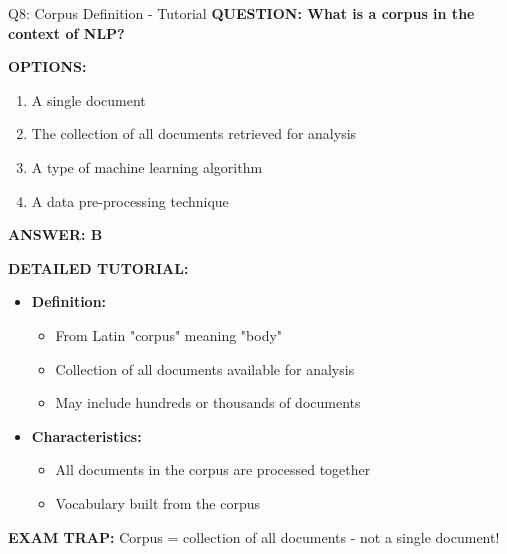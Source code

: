\documentclass[8pt]{beamer}
\begin{document}
	\begin{frame}{Q8: Corpus Definition - Tutorial}
		\fontsize{6.5}{7.5}\selectfont
		\textbf{QUESTION: What is a corpus in the context of NLP?}
		
		\vspace{0.1cm}
		\textbf{OPTIONS:}
		\begin{enumerate}
			\item A single document
			\item The collection of all documents retrieved for analysis
			\item A type of machine learning algorithm
			\item A data pre-processing technique
		\end{enumerate}
		
		\vspace{0.1cm}
		\textcolor{myblue}{\textbf{ANSWER: B}}
		
		\vspace{0.1cm}
		\textbf{DETAILED TUTORIAL:}
		\begin{itemize}
			\item \textbf{Definition:}
			\begin{itemize}
				\item From Latin "corpus" meaning "body"
				\item Collection of all documents available for analysis
				\item May include hundreds or thousands of documents
			\end{itemize}
			\item \textbf{Characteristics:}
			\begin{itemize}
				\item All documents in the corpus are processed together
				\item Vocabulary built from the corpus
			\end{itemize}
		\end{itemize}
		
		\textcolor{myred}{\textbf{EXAM TRAP:}} Corpus = \textcolor{myblue}{collection of all documents} - not a single document!
	\end{frame}
	
\end{document}
